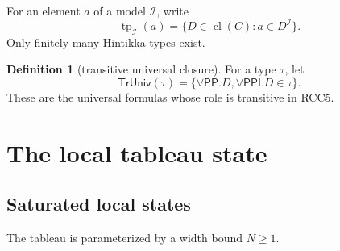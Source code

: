 \documentclass[11pt]{article}
\theoremstyle{definition}
\newtheorem{definition}[theorem]{Definition}
\newcommand{\cl}{\operatorname{cl}}
\newcommand{\tp}{\operatorname{tp}}
\newcommand{\Pp}{\mathsf{PP}}
\newcommand{\Ppi}{\mathsf{PPI}}
\begin{document}
For an element $a$ of a model $\mathcal I$, write
\[
\tp_{\mathcal I}(a)=\{D\in \cl(C): a\in D^{\mathcal I}\}.
\]
Only finitely many Hintikka types exist.

\begin{definition}[transitive universal closure]
For a type $\tau$, let
\[
\mathsf{TrUniv}(\tau)=\{\forall \Pp.D,\forall \Ppi.D\in \tau\}.
\]
These are the universal formulas whose role is transitive in RCC5.
\end{definition}

\section{The local tableau state}

\subsection{Saturated local states}

The tableau is parameterized by a width bound $N\geq 1$.
\end{document}
